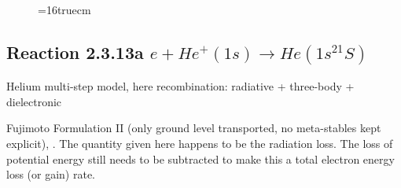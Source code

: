 \documentclass[12pt,dvipdfmx]{article}
\begin{document}
\begin{figure} \label{2.3.9aer}
\epsfxsize=16truecm
\end{figure}
\newpage


\subsection{
Reaction 2.3.13a $e+ He^+(1s) \rightarrow   He(1s^21S)$
}
Helium multi-step model, here recombination:  radiative + three-body + dielectronic

 Fujimoto Formulation II (only ground level transported, no meta-stables
 kept explicit), \cite{kn:Fujimoto}.
 The quantity given here happens to be the radiation loss.
 The loss of potential energy still needs to be subtracted to make
 this a total electron energy loss (or gain) rate.
\end{document}
